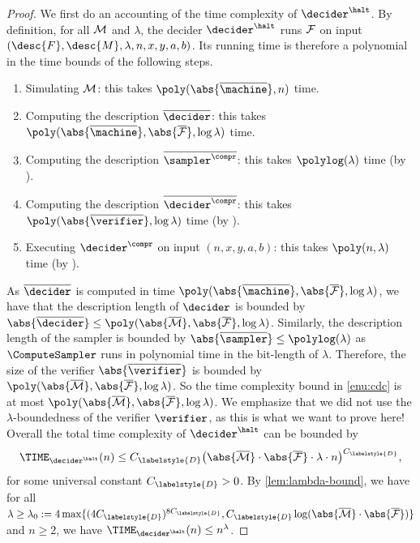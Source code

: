 \begin{proof}

  We first do an accounting of the time complexity of $\decider^\halt$.
  By definition, for all $\cal{M}$ and $\lambda$, the decider $\decider^\halt$
  runs $\cal{F}$ on input $(\desc{F}, \desc{M}, \lambda, n, x, y, a, b)$.
  Its running time is therefore a polynomial in the time bounds of
  the following steps.

  \begin{enumerate}
  \item Simulating $\cal{M}$: this takes $\poly(\abs{\overline{\machine}}, n)$ time.
  \item \label{enu:d} Computing the description $\overline{\decider}$: this
    takes $\poly(\abs{\overline{\machine}}, \abs{\overline{\cal{F}}},\log \lambda)$ time.
  \item Computing the description $\overline{\sampler^\compr}$: this takes
    $\polylog(\lambda)$ time (by ). 
  \item \label{enu:cdc} Computing the description $\overline{\decider^\compr}$: this takes
    $\poly(\abs{\overline{\verifier}}, \log\lambda)$ time (by ). 
  \item \label{enu:rdc} Executing $\decider^\compr$ on input $(n,x,y,a,b)$: this
    takes $\poly(n, \lambda)$ time (by ).
  \end{enumerate}

  As $\overline{\decider}$ is computed in time $\poly(\abs{\overline{\machine}},
  \abs{\overline{\cal{F}}},\log \lambda)$, we have that the description length of $\decider$ is bounded by $\abs{\overline{\decider}} \le
  \poly(\abs{\overline{\cal{M}}}, \abs{\overline{\cal{F}}},\log \lambda)$.
  Similarly, the description length of the sampler is bounded by $\abs{\overline{\sampler}} \le \polylog(\lambda)$ as
  $\ComputeSampler$ runs in polynomial time in the bit-length of $\lambda$.
  Therefore, the size of the verifier $\abs{\overline{\verifier}}$ is bounded by
  $\poly(\abs{\overline{\cal{M}}}, \abs{\overline{\cal{F}}}, \log \lambda)$.
  So the time complexity bound in \cref{enu:cdc} is at most
  $\poly(\abs{\overline{\cal{M}}}, \abs{\overline{\cal{F}}}, \log \lambda)$. We emphasize that we did not use the $\lambda$-boundedness of the verifier
  $\verifier$, as this is what we want to prove here!
  Overall the total time complexity of $\decider^\halt$ can be bounded by
  \begin{equation}\label{eq:125-dec}
    \TIME_{\decider^\halt}(n) \le C_{\labelstyle{D}} \bigl( \abs{\overline{\cal{M}}}
    \cdot \abs{\overline{\cal{F}}} \cdot \lambda \cdot n \bigr)^{C_{\labelstyle{D}}},
  \end{equation}
  for some universal constant $C_{\labelstyle{D}} > 0$. 
  By \cref{lem:lambda-bound}, we have for all $\lambda \ge \lambda_{0} := 4 \max \{ (4C_{\labelstyle{D}})^{8C_{\labelstyle{D}}} , C_\labelstyle{D} \log (\abs{\overline{\cal{M}}} \cdot \abs{\overline{\cal{F}}}) \}$ and $n \ge 2$, we have $\TIME_{\decider^\halt}(n) \le n^\lambda$.


\end{proof}

